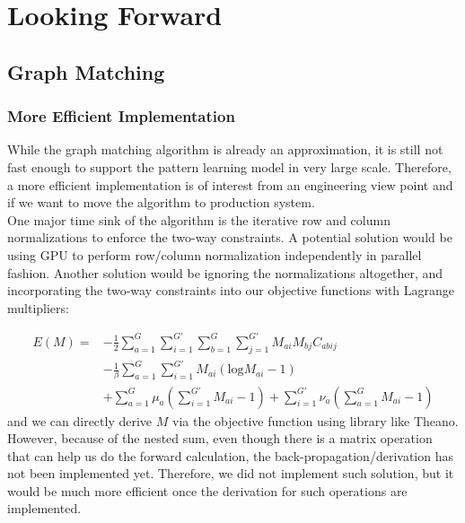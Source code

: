 \chapter{Looking Forward}

\section{Graph Matching}

\subsection{More Efficient Implementation}

While the graph matching algorithm is already an approximation, it is still not fast enough to support the pattern learning model in very large scale. Therefore, a more efficient implementation is of interest from an engineering view point and if we want to move the algorithm to production system.\\

One major time sink of the algorithm is the iterative row and column normalizations to enforce the two-way constraints. A potential solution would be using GPU to perform row/column normalization independently in parallel fashion. Another solution would be ignoring the normalizations altogether, and incorporating the two-way constraints into our objective functions with Lagrange multipliers:

\begin{align}
E(M)=&-\frac{1}{2}\sum_{a=1}^{G}\sum_{i=1}^{G'}\sum_{b=1}^{G}\sum_{j=1}^{G'}M_{ai}M_{bj}C_{abij}\nonumber\\
&-\frac{1}{\beta}\sum_{a=1}^{G}\sum_{i=1}^{G'}M_{ai}(\text{log}M_{ai}-1)\nonumber\\
&+\sum_{a=1}^{G}\mu_a(\sum_{i=1}^{G'}M_{ai}-1)+\sum_{i=1}^{G'}\nu_a(\sum_{a=1}^{G}M_{ai}-1)
\end{align}
and we can directly derive $M$ via the objective function using library like Theano\footnotemark. However, because of the nested sum, even though there is a matrix operation that can help us do the forward calculation, the back-propagation/derivation has not been implemented yet. Therefore, we did not implement such solution, but it would be much more efficient once the derivation for such operations are implemented.\\


